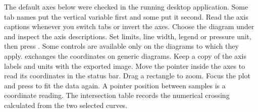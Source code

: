
The default axes below were checked in the running desktop application. Some tab names put the vertical variable first and some put it second. Read the axis captions whenever you switch tabs or invert the axes.
Choose the diagram under  and inspect the axis descriptions. Set limits, line width, legend or pressure unit, then press . Some controls are available only on the diagrams to which they apply.  exchanges the coordinates on generic diagrams. Keep a copy of the axis labels and units with the exported image.
Move the pointer inside the axes to read its coordinates in the status bar. Drag a rectangle to zoom. Focus the plot and press  to fit the data again. A pointer position between samples is a coordinate reading. The intersection table records the numerical crossing calculated from the two selected curves.

